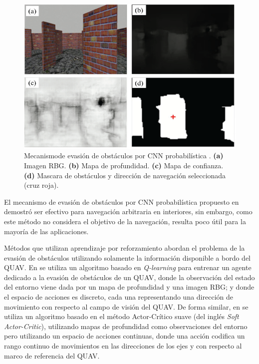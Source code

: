 \begin{figure}[H]
    \centering
    \includegraphics[scale=0.4]{partes/img/P-CNN.png}
    \caption[Mecanismo de evasión de obstáculos por CNN probabilística.]{Mecanismo\footnotemark de evasión de obstáculos por CNN probabilística \cite{Yang2021}. \textbf{(a)} Imagen RBG. \textbf{(b)} Mapa de profundidad. \textbf{(c)} Mapa de confianza. \textbf{(d)} Mascara de obstáculos y dirección de navegación seleccionada (cruz roja).} 
    \label{fig:P-CNN}
\end{figure}

El mecanismo de evasión de obstáculos por CNN probabilística propuesto en \cite{Yang2021} demostró ser efectivo para navegación arbitraria en interiores, sin embargo, como este método no considera el objetivo de la navegación, resulta poco útil para la mayoría de las aplicaciones.

Métodos que utilizan aprendizaje por reforzamiento abordan el problema de la evasión de obstáculos utilizando solamente la información disponible a bordo del QUAV. En \cite{Tu2023} se utiliza un algoritmo basado en \textit{Q-learning} para entrenar un agente dedicado a la evasión de obstáculos de un QUAV, donde la observación del estado del entorno viene dada por un mapa de profundidad y una imagen RBG; y donde el espacio de acciones es discreto, cada una representando una dirección de movimiento con respecto al campo de visión del QUAV. De forma similar, en \cite{Xue2021} se utiliza un algoritmo basado en el método Actor-Crítico suave (del inglés \textit{Soft Actor-Critic}), utilizando mapas de profundidad como observaciones del entorno pero utilizando un espacio de acciones continuas, donde una acción codifica un rango continuo de movimientos en las direcciones de los ejes  y  con respecto al marco de referencia del QUAV. 

